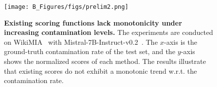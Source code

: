 
\begin{figure}[t!]
    \begin{center}
    \texttt{[image: B\_Figures/figs/prelim2.png]}
    \end{center}
    \vspace{-3mm}
    \caption{\textbf{Existing scoring functions lack monotonicity under increasing contamination levels.} The experiments are conducted on WikiMIA~\cite{shidetecting} with Mistral-7B-Instruct-v0.2~\cite{jiang2023mistral}. The $x$-axis is the ground-truth contamination rate of the test set, and the $y$-axis shows the normalized scores of each method. The results illustrate that existing scores do not exhibit a monotonic trend w.r.t. the contamination rate.}
\label{fig:prelim}
\end{figure}